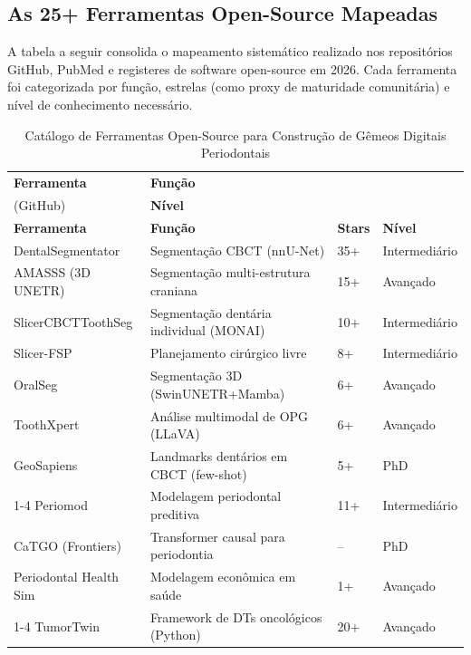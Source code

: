 \subsection{As 25+ Ferramentas Open-Source Mapeadas}

A tabela a seguir consolida o mapeamento sistemático realizado nos repositórios GitHub, PubMed e registeres de software open-source em 2026. Cada ferramenta foi categorizada por função, estrelas (como proxy de maturidade comunitária) e nível de conhecimento necessário.

\footnotesize
\begin{longtable}[c]{p{3.5cm}p{5cm}p{2cm}p{3cm}}
\caption{Catálogo de Ferramentas Open-Source para Construção de Gêmeos Digitais Periodontais} \\
\toprule
\textbf{Ferramenta}\footnotemark[7] & \textbf{Função}\footnotemark[8] & \textbf{\begin{tabular}[c]{@{}c@{}}Stars\footnotemark[9]\\ (GitHub)\end{tabular}} & \textbf{Nível}\footnotemark[10] \\
\midrule
\endfirsthead
\toprule
\textbf{Ferramenta} & \textbf{Função} & \textbf{Stars} & \textbf{Nível} \\
\midrule
\endhead
\bottomrule
\endfoot
DentalSegmentator & Segmentação CBCT (nnU-Net\footnotemark[11]) & 35+ & Intermediário \\
AMASSS (3D UNETR) & Segmentação multi-estrutura craniana & 15+ & Avançado \\
SlicerCBCTToothSeg & Segmentação dentária individual (MONAI\footnotemark[12]) & 10+ & Intermediário \\
Slicer-FSP & Planejamento cirúrgico livre & 8+ & Intermediário \\
OralSeg & Segmentação 3D (SwinUNETR+Mamba) & 6+ & Avançado \\
ToothXpert & Análise multimodal de OPG (LLaVA) & 6+ & Avançado \\
GeoSapiens & Landmarks dentários em CBCT (few-shot) & 5+ & PhD \\
\cmidrule{1-4}
Periomod & Modelagem periodontal preditiva & 11+ & Intermediário \\
CaTGO (Frontiers) & Transformer causal para periodontia & -- & PhD \\
Periodontal Health Sim & Modelagem econômica em saúde & 1+ & Avançado \\
\cmidrule{1-4}
TumorTwin & Framework de DTs oncológicos (Python) & 20+ & Avançado \\

\end{longtable}
